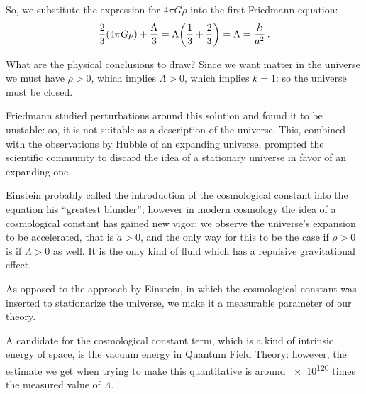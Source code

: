 \documentclass[main.tex]{subfiles}
\begin{document}
So, we substitute the expression for \(4 \pi G \rho \) into the first Friedmann equation: 
%
\begin{equation}
  \frac{2}{3} \qty(4 \pi G \rho ) + \frac{\Lambda}{3} =
  \Lambda \qty(\frac{1}{3}+ \frac{2}{3}) = \Lambda = \frac{k}{a^2}
\,.
\end{equation}

What are the physical conclusions to draw? 
Since we want matter in the universe we must have \(\rho >0\), which implies \(\Lambda >0\), which implies \(k =1\): so the universe must be closed. 

Friedmann studied perturbations around this solution and found it to be unstable: so, it is not suitable as a description of the universe.
This, combined with the observations by Hubble of an expanding universe, prompted the scientific community to discard the idea of a stationary universe in favor of an expanding one.

Einstein probably \cite{autInvestigatingLegendEinstein2018} called the introduction of the cosmological constant into the equation his ``greatest blunder''; however in modern cosmology the idea of a cosmological constant has gained new vigor: we observe the universe's expansion to be accelerated, that is \(\ddot{a} > 0\), and the only way for this to be the case if \(\rho >0\) is if \(\Lambda > 0\) as well. 
It is the only kind of fluid which has a repulsive gravitational effect.

As opposed to the approach by Einstein, in which the cosmological constant was inserted to stationarize the universe, we make it a measurable parameter of our theory.

A candidate for the cosmological constant term, which is a kind of intrinsic energy of space, is the vacuum energy in Quantum Field Theory: however, the estimate we get when trying to make this quantitative is around \num{e120} times the measured value of \(\Lambda \).

\end{document}
